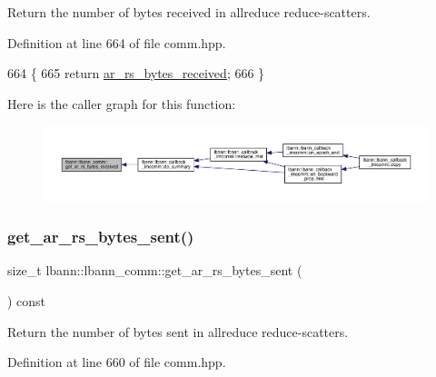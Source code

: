 Return the number of bytes received in allreduce reduce-\/scatters. 

Definition at line 664 of file comm.\+hpp.


\begin{DoxyCode}
664                                                  \{
665     \textcolor{keywordflow}{return} \hyperlink{classlbann_1_1lbann__comm_a2c3e1db0f6d2345748132322b0555db7}{ar\_rs\_bytes\_received};
666   \}
\end{DoxyCode}
Here is the caller graph for this function\+:\nopagebreak
\begin{figure}[H]
\begin{center}
\leavevmode
\includegraphics[width=350pt]{classlbann_1_1lbann__comm_a4ed37b23401cd6df6502229bae0e5a1d_icgraph}
\end{center}
\end{figure}
\mbox{\label{classlbann_1_1lbann__comm_a7b9827e5f46d535c8ab2cf2f6c576291}} 
\subsubsection{\texorpdfstring{get\+\_\+ar\+\_\+rs\+\_\+bytes\+\_\+sent()}{get\_ar\_rs\_bytes\_sent()}}
{\footnotesize\ttfamily size\+\_\+t lbann\+::lbann\+\_\+comm\+::get\+\_\+ar\+\_\+rs\+\_\+bytes\+\_\+sent (\begin{DoxyParamCaption}{ }\end{DoxyParamCaption}) const\hspace{0.3cm}{\ttfamily [inline]}}

Return the number of bytes sent in allreduce reduce-\/scatters. 

Definition at line 660 of file comm.\+hpp.


